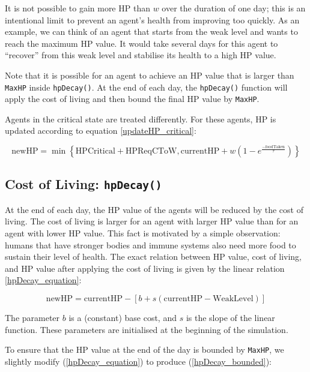 It is not possible to gain more HP than $w$ over the duration of one day; this is an intentional limit to prevent an agent's health from improving too quickly. As an example, we can think of an agent that starts from the weak level and wants to reach the maximum HP value. It would take several days for this agent to ``recover'' from this weak level and stabilise its health to a high HP value. 

Note that it is possible for an agent to achieve an HP value that is larger than \texttt{MaxHP} inside \lstinline$hpDecay()$. At the end of each day, the \lstinline$hpDecay()$ function will apply the cost of living and then bound the final HP value by \lstinline$MaxHP$.


Agents in the critical state are treated differently. For these agents, HP is updated according to equation \eqref{updateHP_critical}:

\begin{equation}\label{updateHP_critical}
    \text{newHP} = \min\left\{\text{HPCritical}+\text{HPReqCToW}, \text{currentHP} +w(1-e^{\frac{-\text{foodTaken}}{\tau}})\right\}
\end{equation}

\subsection{Cost of Living: \texorpdfstring{\lstinline$hpDecay()$}{hpDecay}}\label{hpDecay}
At the end of each day, the HP value of the agents will be reduced by the cost of living. The cost of living is larger for an agent with larger HP value than for an agent with lower HP value. This fact is motivated by a simple observation: humans that have stronger bodies and immune systems also need more food to sustain their level of health. The exact relation between HP value, cost of living, and HP value after applying the cost of living is given by the linear relation \eqref{hpDecay_equation}:

\begin{equation}\label{hpDecay_equation}
    \text{newHP} = \text{currentHP}-\left[b + s(\text{currentHP}-\text{WeakLevel})\right]
\end{equation}


The parameter $b$ is a (constant) base cost, and $s$ is the slope of the linear function. These parameters are initialised at the beginning of the simulation. 

To ensure that the HP value at the end of the day is bounded by \texttt{MaxHP}, we slightly modify (\ref{hpDecay_equation}) to produce (\ref{hpDecay_bounded}):


